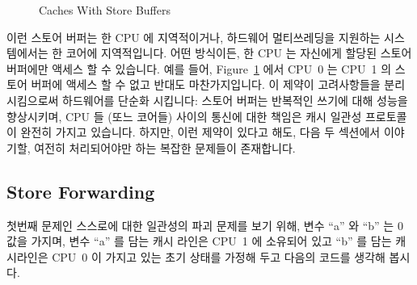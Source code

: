 \begin{figure}[htb]
\centering
{}
\caption{Caches With Store Buffers}
\label{fig:app:whymb:Caches With Store Buffers}
\end{figure}

이런 스토어 버퍼는 한 CPU 에 지역적이거나, 하드웨어 멀티쓰레딩을 지원하는
시스템에서는 한 코어에 지역적입니다.
어떤 방식이든, 한 CPU 는 자신에게 할당된 스토어 버퍼에만 액세스 할 수 있습니다.
예를 들어, Figure~\ref{fig:app:whymb:Caches With Store Buffers} 에서 CPU~0 는
CPU~1 의 스토어 버퍼에 액세스 할 수 없고 반대도 마찬가지입니다.
이 제약이 고려사항들을 분리시킴으로써 하드웨어를 단순화 시킵니다: 스토어 버퍼는
반복적인 쓰기에 대해 성능을 향상시키며, CPU 들 (또느 코어들) 사이의 통신에 대한
책임은 캐시 일관성 프로토콜이 완전히 가지고 있습니다.
하지만, 이런 제약이 있다고 해도, 다음 두 섹션에서 이야기할, 여전히 처리되어야만
하는 복잡한 문제들이 존재합니다.

\subsection{Store Forwarding}
\label{sec:app:whymb:Store Forwarding}

첫번째 문제인 스스로에 대한 일관성의 파괴 문제를 보기 위해, 변수 ``a'' 와 ``b''
는 0 값을 가지며, 변수 ``a'' 를 담는 캐시 라인은 CPU~1 에 소유되어 있고 ``b''
를 담는 캐시라인은 CPU~0 이 가지고 있는 초기 상태를 가정해 두고 다음의 코드를
생각해 봅시다.

